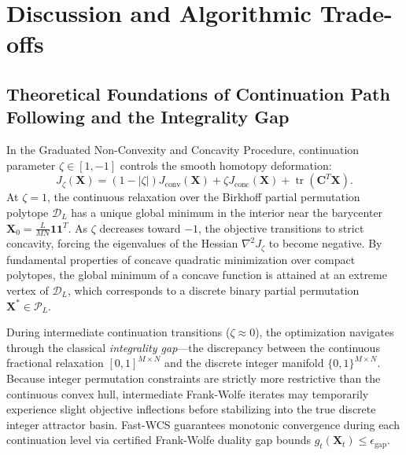 \documentclass[a4paper,fleqn]{cas-dc}
\theoremstyle{thmstyleone}
\theoremstyle{thmstyletwo}
\theoremstyle{thmstylethree}
\begin{document}
\section{Discussion and Algorithmic Trade-offs}
\label{sec:discussion}

\subsection{Theoretical Foundations of Continuation Path Following and the Integrality Gap}
In the Graduated Non-Convexity and Concavity Procedure, continuation parameter $\zeta \in [1, -1]$ controls the smooth homotopy deformation:
\begin{equation}
J_\zeta(\mathbf{X}) = (1 - |\zeta|) J_{\text{conv}}(\mathbf{X}) + \zeta J_{\text{conc}}(\mathbf{X}) + \operatorname{tr}(\mathbf{C}^T\mathbf{X}).
\label{eq:discussion_homotopy}
\end{equation}
At $\zeta = 1$, the continuous relaxation over the Birkhoff partial permutation polytope $\mathcal{D}_L$ has a unique global minimum in the interior near the barycenter $\mathbf{X}_0 = \frac{L}{MN}\mathbf{1}\mathbf{1}^T$. As $\zeta$ decreases toward $-1$, the objective transitions to strict concavity, forcing the eigenvalues of the Hessian $\nabla^2 J_\zeta$ to become negative. By fundamental properties of concave quadratic minimization over compact polytopes, the global minimum of a concave function is attained at an extreme vertex of $\mathcal{D}_L$, which corresponds to a discrete binary partial permutation $\mathbf{X}^* \in \mathcal{P}_L$.

During intermediate continuation transitions ($\zeta \approx 0$), the optimization navigates through the classical \emph{integrality gap}---the discrepancy between the continuous fractional relaxation $[0, 1]^{M \times N}$ and the discrete integer manifold $\{0, 1\}^{M \times N}$. Because integer permutation constraints are strictly more restrictive than the continuous convex hull, intermediate Frank-Wolfe iterates may temporarily experience slight objective inflections before stabilizing into the true discrete integer attractor basin. Fast-WCS guarantees monotonic convergence during each continuation level via certified Frank-Wolfe duality gap bounds $g_t(\mathbf{X}_t) \le \epsilon_{\text{gap}}$.
\end{document}
